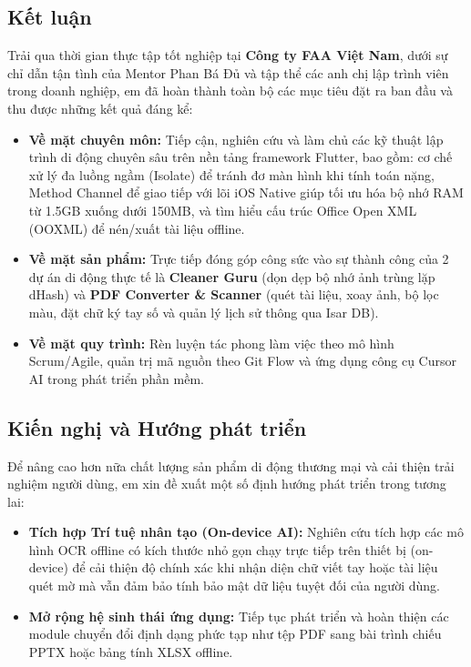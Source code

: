 \documentclass[12pt, a4paper]{article}
\begin{document}
\subsection{Kết luận}
Trải qua thời gian thực tập tốt nghiệp tại \textbf{Công ty FAA Việt Nam}, dưới sự chỉ dẫn tận tình của Mentor Phan Bá Đủ và tập thể các anh chị lập trình viên trong doanh nghiệp, em đã hoàn thành toàn bộ các mục tiêu đặt ra ban đầu và thu được những kết quả đáng kể:
\begin{itemize}
    \item \textbf{Về mặt chuyên môn:} Tiếp cận, nghiên cứu và làm chủ các kỹ thuật lập trình di động chuyên sâu trên nền tảng framework Flutter, bao gồm: cơ chế xử lý đa luồng ngầm (Isolate) để tránh đơ màn hình khi tính toán nặng, Method Channel để giao tiếp với lõi iOS Native giúp tối ưu hóa bộ nhớ RAM từ 1.5GB xuống dưới 150MB, và tìm hiểu cấu trúc Office Open XML (OOXML) để nén/xuất tài liệu offline.
    \item \textbf{Về mặt sản phẩm:} Trực tiếp đóng góp công sức vào sự thành công của 2 dự án di động thực tế là \textbf{Cleaner Guru} (dọn dẹp bộ nhớ ảnh trùng lặp dHash) và \textbf{PDF Converter \& Scanner} (quét tài liệu, xoay ảnh, bộ lọc màu, đặt chữ ký tay số và quản lý lịch sử thông qua Isar DB).
    \item \textbf{Về mặt quy trình:} Rèn luyện tác phong làm việc theo mô hình Scrum/Agile, quản trị mã nguồn theo Git Flow và ứng dụng công cụ Cursor AI trong phát triển phần mềm.
\end{itemize}

\subsection{Kiến nghị và Hướng phát triển}
Để nâng cao hơn nữa chất lượng sản phẩm di động thương mại và cải thiện trải nghiệm người dùng, em xin đề xuất một số định hướng phát triển trong tương lai:
\begin{itemize}
    \item \textbf{Tích hợp Trí tuệ nhân tạo (On-device AI):} Nghiên cứu tích hợp các mô hình OCR offline có kích thước nhỏ gọn chạy trực tiếp trên thiết bị (on-device) để cải thiện độ chính xác khi nhận diện chữ viết tay hoặc tài liệu quét mờ mà vẫn đảm bảo tính bảo mật dữ liệu tuyệt đối của người dùng.
    \item \textbf{Mở rộng hệ sinh thái ứng dụng:} Tiếp tục phát triển và hoàn thiện các module chuyển đổi định dạng phức tạp như tệp PDF sang bài trình chiếu PPTX hoặc bảng tính XLSX offline.
\end{itemize}
\end{document}
